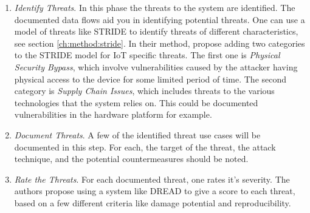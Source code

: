 \begin{enumerate}
    \item \textit{Identify Threats}. In this phase the threats to the system are identified. The documented data flows aid you in identifying potential threats. One can use a model of threats like STRIDE\cite{stride} to identify threats of different characteristics, see section \ref{ch:method:stride}. In their method, \citeauthor{guzman2017iot} propose adding two categories to the STRIDE model for IoT specific threats. The first one is \textit{Physical Security Bypass}, which involve vulnerabilities caused by the attacker having physical access to the device for some limited period of time. The second category is \textit{Supply Chain Issues}, which includes threats to the various technologies that the system relies on. This could be documented vulnerabilities in the hardware platform for example.
    \item \textit{Document Threats}. A few of the identified threat use cases will be documented in this step. For each, the target of the threat, the attack technique, and the potential countermeasures should be noted.
    \item \textit{Rate the Threats}. For each documented threat, one rates it's severity. The authors propose using a system like DREAD to give a score to each threat, based on a few different criteria like damage potential and reproducibility.
\end{enumerate}


